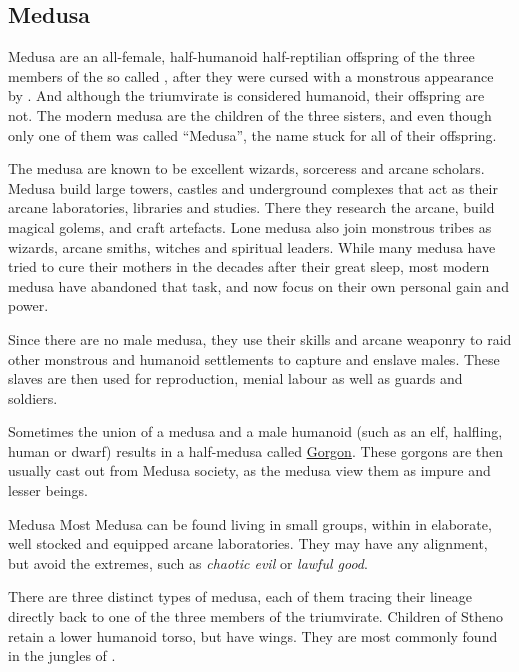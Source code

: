 \subsection{Medusa}
\label{sec:Medusa}

Medusa are an all-female, half-humanoid half-reptilian offspring of the three
members of the so called , after they were cursed
with a monstrous appearance by . And although the
triumvirate is considered humanoid, their offspring are not. The modern medusa
are the children of the three sisters, and even though only one of them was
called ``Medusa'', the name stuck for all of their offspring.

The medusa are known to be excellent wizards, sorceress and arcane
scholars. Medusa build large towers, castles and underground complexes that
act as their arcane laboratories, libraries and studies. There they research
the arcane, build magical golems, and craft artefacts. Lone medusa also join
monstrous tribes as wizards, arcane smiths, witches and spiritual leaders.
While many medusa have tried to cure their mothers in the decades after their
great sleep, most modern medusa have abandoned that task, and now focus on
their own personal gain and power.

Since there are no male medusa, they use their skills and arcane weaponry
to raid other monstrous and humanoid settlements to capture and enslave
males. These slaves are then used for reproduction, menial labour as well as
guards and soldiers.

Sometimes the union of a medusa and a male humanoid (such as an elf, halfling,
human or dwarf) results in a half-medusa called \hyperref[sec:Gorgons]{Gorgon}.
These gorgons are then usually cast out from Medusa society, as the medusa
view them as impure and lesser beings.

\begin{35e}{Medusa}
  Most Medusa can be found living in small groups, within in elaborate, well
  stocked and equipped arcane laboratories. They may have any alignment, but
  avoid the extremes, such as \emph{chaotic evil} or \emph{lawful good}.
\end{35e}

There are three distinct types of medusa, each of them tracing their lineage
directly back to one of the three members of the triumvirate. Children of Stheno
retain a lower humanoid torso, but have wings. They are most commonly found in
the jungles of .

